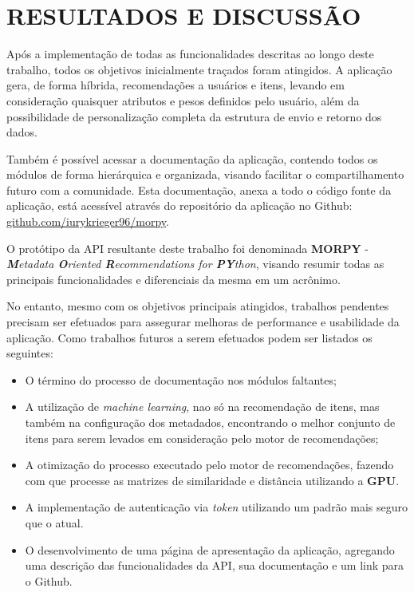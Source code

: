 \chapter{RESULTADOS E DISCUSSÃO}

Após a implementação de todas as funcionalidades descritas ao longo deste trabalho, todos os objetivos inicialmente traçados foram atingidos. A aplicação gera, de forma híbrida, recomendações a usuários e itens, levando em consideração quaisquer atributos e pesos definidos pelo usuário, além da possibilidade de personalização completa da estrutura de envio e retorno dos dados.

Também é possível acessar a documentação da aplicação, contendo todos os módulos de forma hierárquica e organizada, visando facilitar o compartilhamento futuro com a comunidade. Esta documentação, anexa a todo o código fonte da aplicação, está acessível através do repositório da aplicação no Github: \url{github.com/iurykrieger96/morpy}.

O protótipo da API resultante deste trabalho foi denominada \textbf{MORPY} - \textit{\textbf{M}etadata \textbf{O}riented \textbf{R}ecommendations for \textbf{PY}thon}, visando resumir todas as principais funcionalidades e diferenciais da mesma em um acrônimo.

No entanto, mesmo com os objetivos principais atingidos, trabalhos pendentes precisam ser efetuados para assegurar melhoras de performance e usabilidade da aplicação. Como trabalhos futuros a serem efetuados podem ser listados os seguintes:

\begin{itemize}
	\item O término do processo de documentação nos módulos faltantes;

	\item A utilização de \textit{machine learning}, nao só na recomendação de itens, mas também na configuração dos metadados, encontrando o melhor conjunto de itens para serem levados em consideração pelo motor de recomendações;

	\item A otimização do processo executado pelo motor de recomendações, fazendo com que processe as matrizes de similaridade e distância utilizando a \textbf{GPU}.

	\item A implementação de autenticação via \textit{token} utilizando um padrão mais seguro que o atual.

	\item O desenvolvimento de uma página de apresentação da aplicação, agregando uma descrição das funcionalidades da API, sua documentação e um link para o Github.
\end{itemize}